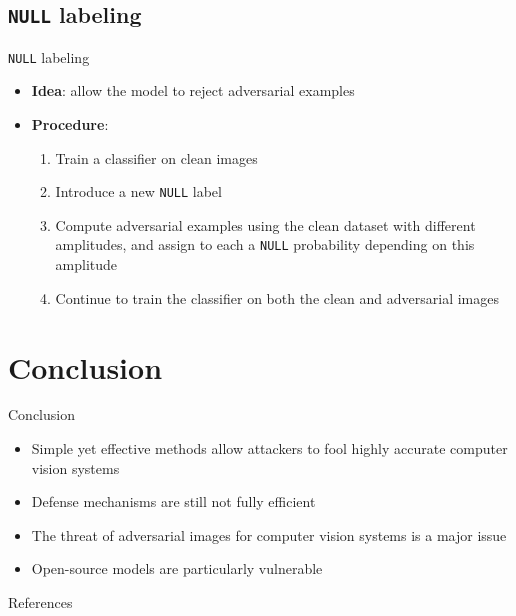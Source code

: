 \documentclass[aspectratio=169]{beamer}
\theoremstyle{definition}
\begin{document}
\subsection{\texttt{NULL} labeling}
\begin{frame}{\texttt{NULL} labeling}
  \begin{itemize}
    \item \textbf{Idea}: allow the model to reject adversarial examples
    \item \textbf{Procedure}:
    \begin{enumerate}
      \item Train a classifier on clean images
      \item Introduce a new \texttt{NULL} label
      \item Compute adversarial examples using the clean dataset with different amplitudes, and assign to each a \texttt{NULL} probability depending on this amplitude
      \item Continue to train the classifier on both the clean and adversarial images
    \end{enumerate}
  \end{itemize}
\end{frame}

\section{Conclusion}
\begin{frame}{Conclusion}
  \begin{itemize}
    \item Simple yet effective methods allow attackers to fool highly accurate computer vision systems
    \item Defense mechanisms are still not fully efficient
    \item The threat of adversarial images for computer vision systems is a major issue
    \item Open-source models are particularly vulnerable
  \end{itemize}
\end{frame}


\begin{frame}{References}
    \nocite{*}
    \printbibliography
\end{frame}
\end{document}
